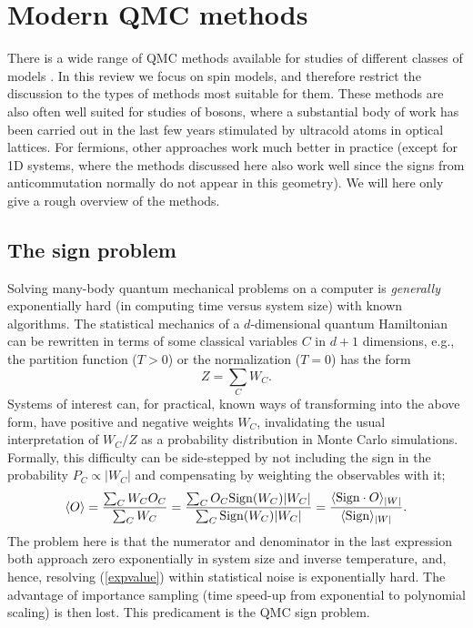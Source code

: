 \documentclass[range]{ar2e}
\begin{document}
\section{Modern QMC methods}
\label{sec:methods}

There is a wide range of QMC methods available for studies of different classes of models \cite{Assaad07,Evertz03,Sandvik10b}. In this review we 
focus on spin models, and therefore restrict the discussion to the types of methods most suitable for them. These methods are also often well suited 
for studies of bosons, where a substantial body of work has been carried out in the last few years stimulated by ultracold atoms in optical lattices. 
For fermions, other approaches work much better in practice (except for 1D systems, where the methods discussed here also work well since the 
signs from anticommutation normally do not appear in this geometry). We will here only give a rough overview of the methods.

\subsection{The sign problem}
\label{ss:sign}

Solving many-body quantum mechanical problems on a computer is {\em generally} exponentially hard (in computing time versus system size) 
with known algorithms. The statistical mechanics of a $d$-dimensional quantum Hamiltonian can be rewritten in terms of some classical variables 
$C$ in $d+1$ dimensions, e.g., the partition function ($T>0$) or the normalization ($T=0$) has the form
\begin{equation}
\label{eq:wc}
Z=\sum_C W_C.
\end{equation}
Systems of interest can, for practical, known ways of transforming into the above form, have positive and negative weights $W_C$, 
invalidating the usual interpretation of $W_C/Z$ as a probability distribution in Monte Carlo simulations. Formally, this difficulty 
can be side-stepped by not including the sign in the probability $P_C \propto |W_C|$ and compensating by weighting the observables with it;
\begin{equation}
\langle O \rangle = \frac{\sum_C W_C O_C}{\sum_C W_C} =
\frac{\sum_C O_C {\rm Sign}(W_C) |W_C|}{\sum_C {\rm Sign}(W_C)|W_C|} = 
\frac{\langle {\rm Sign} \cdot O\rangle_{|W|}}{\langle {\rm Sign}\rangle_{|W|}}.
\label{expvalue}
\end{equation}
The problem here is that the numerator and denominator in the last expression both approach zero
exponentially in system size and inverse temperature, and, hence, resolving (\ref{expvalue})
within statistical noise is exponentially hard. The advantage of importance sampling (time speed-up 
from exponential to polynomial scaling) is then lost. This predicament is the QMC sign problem.
\end{document}

